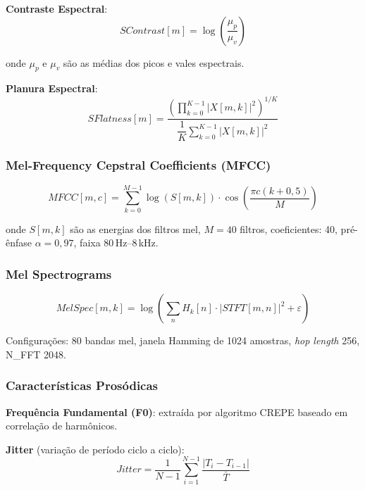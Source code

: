\documentclass[12pt,a4paper]{article}
\begin{document}
\textbf{Contraste Espectral}:
\begin{equation}
SContrast[m] = \log\!\left(\frac{\mu_p}{\mu_v}\right)
\end{equation}

onde $\mu_p$ e $\mu_v$ s\~{a}o as m\'{e}dias dos picos e vales espectrais.

\textbf{Planura Espectral}:
\begin{equation}
SFlatness[m] =
\frac{\left(\displaystyle\prod_{k=0}^{K-1}|X[m,k]|^2\right)^{1/K}}
     {\dfrac{1}{K}\displaystyle\sum_{k=0}^{K-1}|X[m,k]|^2}
\end{equation}

\subsubsection{Mel-Frequency Cepstral Coefficients (MFCC)}

\begin{equation}
MFCC[m,c] = \sum_{k=0}^{M-1}\log(S[m,k])\cdot
\cos\!\left(\frac{\pi c(k+0{,}5)}{M}\right)
\end{equation}

onde $S[m,k]$ s\~{a}o as energias dos filtros mel, $M=40$ filtros,
coeficientes: 40, pr\'{e}-\^{e}nfase $\alpha=0{,}97$, faixa
80\,Hz--8\,kHz.

\subsubsection{Mel Spectrograms}

\begin{equation}
MelSpec[m,k] = \log\!\left(\sum_{n}H_k[n]\cdot|STFT[m,n]|^2 +
\varepsilon\right)
\end{equation}

Configura\c{c}\~{o}es: 80 bandas mel, janela Hamming de 1024 amostras,
\textit{hop length} 256, N\_FFT 2048.

\subsubsection{Caracter\'{i}sticas Pros\'{o}dicas}

\textbf{Frequ\^{e}ncia Fundamental (F0)}: extra\'{i}da por algoritmo CREPE
baseado em correla\c{c}\~{a}o de harm\^{o}nicos.

\textbf{Jitter} (varia\c{c}\~{a}o de per\'{i}odo ciclo a ciclo):
\begin{equation}
Jitter = \frac{1}{N-1}\sum_{i=1}^{N-1}\frac{|T_i - T_{i-1}|}{\bar{T}}
\end{equation}
\end{document}
